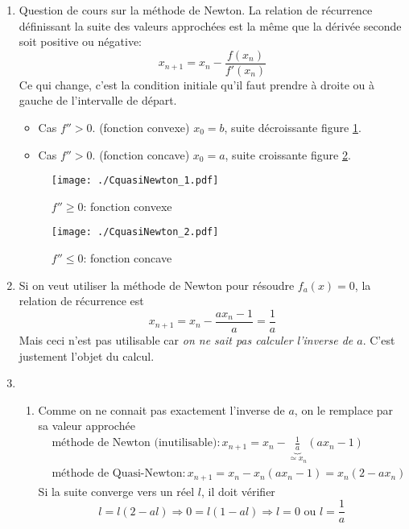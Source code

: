 \begin{enumerate}
  \item Question de cours sur la méthode de Newton.\newline
  La relation de récurrence définissant la suite des valeurs approchées est la même que la dérivée seconde soit positive ou négative:
\begin{displaymath}
  x_{n+1} = x_n - \frac{f(x_n)}{f'(x_n)}
\end{displaymath}
Ce qui change, c'est la condition initiale qu'il faut prendre à droite ou à gauche de l'intervalle de départ.
\begin{itemize}
  \item Cas $f''>0$. (fonction convexe) $x_0 = b$, suite décroissante figure \ref{fig: CquasiNewton_1}.
  \item Cas $f''>0$. (fonction concave) $x_0 = a$, suite croissante figure \ref{fig: CquasiNewton_2}.
\end{itemize}

\begin{figure}[h]
  \centering
  \texttt{[image: ./CquasiNewton\_1.pdf]}
  \caption{$f''\geq 0$: fonction convexe}
  \label{fig: CquasiNewton_1}
\end{figure}
\begin{figure}[h]
  \centering
  \texttt{[image: ./CquasiNewton\_2.pdf]}
  \caption{$f''\leq 0$: fonction concave}
  \label{fig: CquasiNewton_2}
\end{figure}

  \item Si on veut utiliser la méthode de Newton pour résoudre $f_a(x) = 0$, la relation de récurrence est 
\begin{displaymath}
  x_{n+1} = x_n - \frac{ax_n -1}{ a} = \frac{1}{a}
\end{displaymath}
Mais ceci n'est pas utilisable car \emph{on ne sait pas calculer l'inverse de $a$}. C'est justement l'objet du calcul. 

  \item
\begin{enumerate}
  \item Comme on ne connait pas exactement l'inverse de $a$, on le remplace par sa valeur approchée 
\begin{align*}
  &\text{méthode de Newton (inutilisable)}: x_{n+1} = x_n - \underset{\simeq x_n}{\underbrace{\frac{1}{ a}}}(ax_n -1) \\
  &\text{méthode de Quasi-Newton}: x_{n+1} = x_n-x_n(ax_n - 1) = x_n(2-ax_n)
\end{align*}
Si la suite converge vers un réel $l$, il doit vérifier
\begin{displaymath}
  l=l(2-al) \Rightarrow 0 = l(1-al) \Rightarrow l =0 \text{ ou } l=\frac{1}{a}
\end{displaymath}


\end{enumerate}
\end{enumerate}

